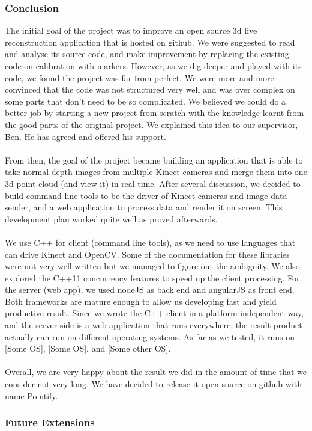 \documentclass{article}
\begin{document}
\subsubsection{Conclusion}
The initial goal of the project was to improve an open source 3d live reconstruction application that is hosted on github. We were suggested to read and analyse its source code, and make improvement by replacing the existing code on calibration with markers. However, as we dig deeper and played with its code, we found the project was far from perfect. We were more and more convinced that the code was not structured very well and was over complex on some parts that don't need to be so complicated. We believed we could do a better job by starting a new project from scratch with the knowledge learnt from the good parts of the original project. We explained this idea to our supervisor, Ben. He has agreed and offered his support.
\\\\
From then, the goal of the project became building an application that is able to take normal depth images from multiple Kinect cameras and merge them into one 3d point cloud (and view it) in real time. After several discussion, we decided to build command line tools to be the driver of Kinect cameras and image data sender, and a web application to process data and render it on screen. This development plan worked quite well as proved afterwards.
\\\\
We use C++ for client (command line tools), as we need to use languages that can drive Kinect and OpenCV. Some of the documentation for these libraries were not very well written but we managed to figure out the ambiguity. We also explored the C++11 concurrency features to speed up the client processing. For the server (web app), we used nodeJS as back end and angularJS as front end. Both frameworks are mature enough to allow us developing fast and yield productive result. Since we wrote the C++ client in a platform independent way, and the server side is a web application that runs everywhere, the result product actually can run on different operating systems. As far as we tested, it runs on [Some OS], [Some OS], and [Some other OS].
\\\\
Overall, we are very happy about the result we did in the amount of time that we consider not very long. We have decided to release it open source on github with name Pointify.
\subsubsection{Future Extensions}

\end{document}
